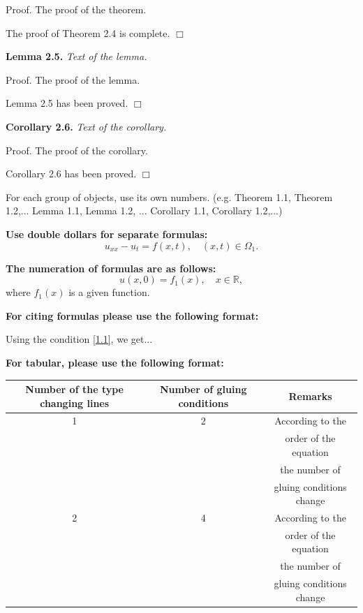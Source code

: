 \documentclass{article}
\begin{document}
\medskip
{\sf Proof. } The proof of the theorem. 

The proof of Theorem 2.4 is complete.  
\hfill $\Box$ 

\textbf{Lemma 2.5.}
\emph{Text of the lemma.}

\medskip
{\sf Proof. } The proof of the lemma. 

Lemma 2.5 has been proved.  
\hfill $\Box$


\textbf{Corollary 2.6.}
\emph{Text of the corollary.}

\medskip
{\sf Proof. } The proof of the corollary. 

Corollary 2.6 has been proved.  
\hfill $\Box$

\medskip
For each group of objects, use its own numbers. (e.g. Theorem 1.1, Theorem 1.2,... Lemma 1.1, Lemma 1.2, ... Corollary 1.1, Corollary 1.2,...)

\textbf{Use double dollars for separate formulas:}
$$
u_{xx}-u_{t}=f(x,t), \quad (x,t) \in \Omega_1.
$$

\textbf{The numeration of formulas are as follows:}
\begin{equation}\label{1.1}
u(x,0)=f_1(x), \quad x\in\mathbb{R},
\end{equation}
where $f_1(x)$ is a given function.


\textbf{For citing formulas please use the following format:} 

Using the condition \eqref{1.1}, we get...


\medskip
\textbf{For tabular, please use the following format:}

\bigskip
\begin{center}

\begin{tabular}{|c|c|c|}
	\hline 
	Number of the type changing lines  & Number of gluing conditions & Remarks \\ 
	\hline 
	1& 2 & According to the \\ &&order of the equation \\ && the number of \\ &&gluing conditions change\\ 
	\hline 
	2& 4 & According to the \\ &&order of the equation \\ && the number of \\ &&gluing conditions change\\
	\hline 
\end{tabular} 
\end{center}
\end{document}
